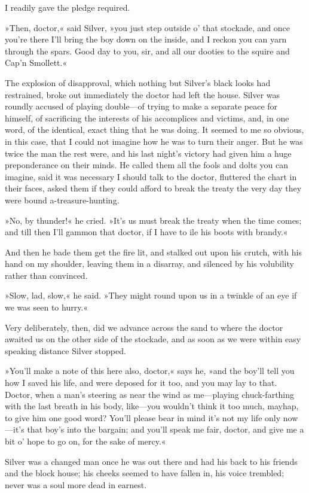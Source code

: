 I readily gave the pledge required.

»Then, doctor,« said Silver, »you just step outside o' that stockade, and once you're there I'll bring the boy down on the inside, and I reckon you can yarn through the spars. Good day to you, sir, and all our dooties to the squire and Cap'n Smollett.«

The explosion of disapproval, which nothing but Silver's black looks had restrained, broke out immediately the doctor had left the house. Silver was roundly accused of playing double—of trying to make a separate peace for himself, of sacrificing the interests of his accomplices and victims, and, in one word, of the identical, exact thing that he was doing. It seemed to me so obvious, in this case, that I could not imagine how he was to turn their anger. But he was twice the man the rest were, and his last night's victory had given him a huge preponderance on their minds. He called them all the fools and dolts you can imagine, said it was necessary I should talk to the doctor, fluttered the chart in their faces, asked them if they could afford to break the treaty the very day they were bound a-treasure-hunting.

»No, by thunder!« he cried. »It's us must break the treaty when the time comes; and till then I'll gammon that doctor, if I have to ile his boots with brandy.«

And then he bade them get the fire lit, and stalked out upon his crutch, with his hand on my shoulder, leaving them in a disarray, and silenced by his volubility rather than convinced.

»Slow, lad, slow,« he said. »They might round upon us in a twinkle of an eye if we was seen to hurry.«

Very deliberately, then, did we advance across the sand to where the doctor awaited us on the other side of the stockade, and as soon as we were within easy speaking distance Silver stopped.

»You'll make a note of this here also, doctor,« says he, »and the boy'll tell you how I saved his life, and were deposed for it too, and you may lay to that. Doctor, when a man's steering as near the wind as me—playing chuck-farthing with the last breath in his body, like—you wouldn't think it too much, mayhap, to give him one good word? You'll please bear in mind it's not my life only now—it's that boy's into the bargain; and you'll speak me fair, doctor, and give me a bit o' hope to go on, for the sake of mercy.«

Silver was a changed man once he was out there and had his back to his friends and the block house; his cheeks seemed to have fallen in, his voice trembled; never was a soul more dead in earnest.

